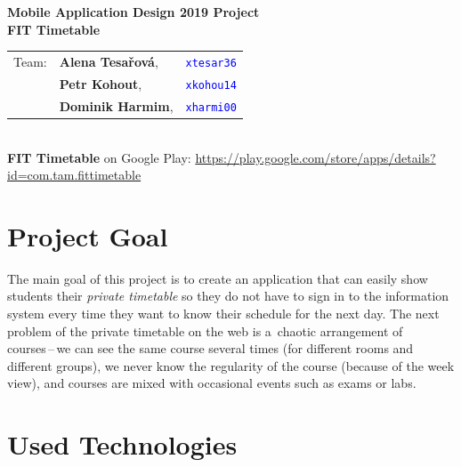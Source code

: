 \documentclass[12pt, a4paper, titlepage, final]{article}
\newcommand\Course{Mobile Application Design 2019 Project}
\newcommand\WorkTitle{FIT Timetable}
\newcommand\AuthorA{Alena Tesařová}
\newcommand\AuthorALogin{xtesar36}
\newcommand\AuthorB{Petr Kohout}
\newcommand\AuthorBLogin{xkohou14}
\newcommand\AuthorC{Dominik Harmim}
\newcommand\AuthorCLogin{xharmi00}
\begin{document}

\begin{titlepage}
	\begin{center}
		\large
		\textbf{\Course} \\
		\bigskip
		\Large
		\textbf{\WorkTitle} \\
	\end{center}
	\large
	\begin{tabular}{lll}
		Team: & \textbf{\AuthorA}, & \texttt{\textcolor{blue}{\AuthorALogin}} \\
		& \textbf{\AuthorB}, & \texttt{\textcolor{blue}{\AuthorBLogin}} \\
		& \textbf{\AuthorC}, & \texttt{\textcolor{blue}{\AuthorCLogin}} \\
	\end{tabular} \\
	\small
	\textbf{\WorkTitle} on Google Play:
	\url{https://play.google.com/store/apps/details?id=com.tam.fittimetable}
\end{titlepage}


\section*{Project Goal}

The main goal of this project is to create an application that can easily show
students their \emph{private timetable} so they do not have to sign in to the
information system every time they want to know their schedule for the next day.
The next problem of the private timetable on the web is a~chaotic arrangement of
courses\,--\,we can see the same course several times (for different rooms and
different groups), we never know the regularity of the course (because of the
week view), and courses are mixed with occasional events such as exams or labs.


\section*{Used Technologies}
\end{document}
